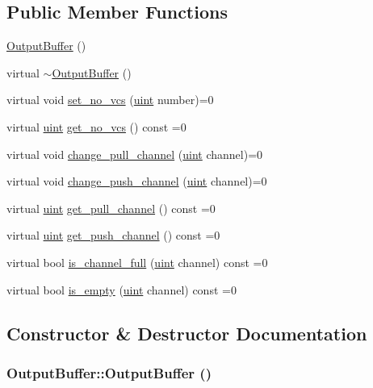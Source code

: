 \subsection*{Public Member Functions}
\begin{CompactItemize}
\item 
\hyperlink{classOutputBuffer_7a4352dc067a09bf7076bd7f8c6f6e1b}{OutputBuffer} ()
\item 
virtual \hyperlink{classOutputBuffer_928cc1b1e5cef13f3572c13775d547b5}{$\sim$OutputBuffer} ()
\item 
virtual void \hyperlink{classOutputBuffer_5fafb6827567941d238ae16991c5c1a8}{set\_\-no\_\-vcs} (\hyperlink{outputBuffer_8h_91ad9478d81a7aaf2593e8d9c3d06a14}{uint} number)=0
\item 
virtual \hyperlink{outputBuffer_8h_91ad9478d81a7aaf2593e8d9c3d06a14}{uint} \hyperlink{classOutputBuffer_21ad5222afd999f390df4a495eb48b0a}{get\_\-no\_\-vcs} () const =0
\item 
virtual void \hyperlink{classOutputBuffer_fb8e0a16f34dcff4c0d954201712f762}{change\_\-pull\_\-channel} (\hyperlink{outputBuffer_8h_91ad9478d81a7aaf2593e8d9c3d06a14}{uint} channel)=0
\item 
virtual void \hyperlink{classOutputBuffer_45a685173b5c5cbe6270c9e0ce6d023a}{change\_\-push\_\-channel} (\hyperlink{outputBuffer_8h_91ad9478d81a7aaf2593e8d9c3d06a14}{uint} channel)=0
\item 
virtual \hyperlink{outputBuffer_8h_91ad9478d81a7aaf2593e8d9c3d06a14}{uint} \hyperlink{classOutputBuffer_c4460c1a1ac34667c12cc77c57a393b9}{get\_\-pull\_\-channel} () const =0
\item 
virtual \hyperlink{outputBuffer_8h_91ad9478d81a7aaf2593e8d9c3d06a14}{uint} \hyperlink{classOutputBuffer_bafd65458146d9b383643fef94b38881}{get\_\-push\_\-channel} () const =0
\item 
virtual bool \hyperlink{classOutputBuffer_23aaeb2aa62e944596d50a569ed5d859}{is\_\-channel\_\-full} (\hyperlink{outputBuffer_8h_91ad9478d81a7aaf2593e8d9c3d06a14}{uint} channel) const =0
\item 
virtual bool \hyperlink{classOutputBuffer_7cba09e2dbb3794d873862b5066fd085}{is\_\-empty} (\hyperlink{outputBuffer_8h_91ad9478d81a7aaf2593e8d9c3d06a14}{uint} channel) const =0
\end{CompactItemize}


\subsection{Constructor \& Destructor Documentation}
\hypertarget{classOutputBuffer_7a4352dc067a09bf7076bd7f8c6f6e1b}{
\subsubsection[{OutputBuffer}]{\setlength{\rightskip}{0pt plus 5cm}OutputBuffer::OutputBuffer ()}}
\label{classOutputBuffer_7a4352dc067a09bf7076bd7f8c6f6e1b}


